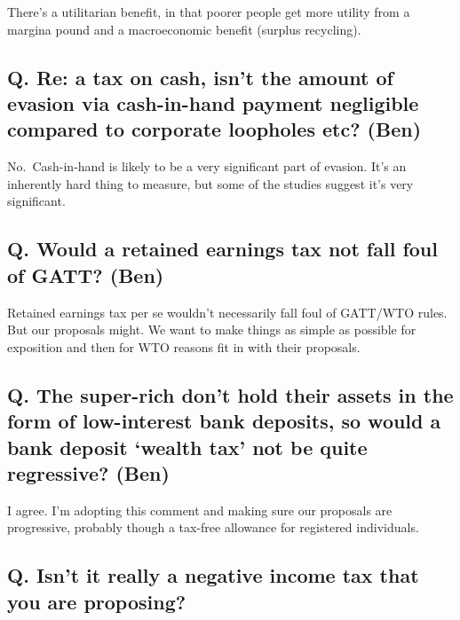 \documentclass[]{tufte-handout}
\begin{document}
There's a utilitarian benefit, in that poorer people get more utility
from a margina pound and a macroeconomic benefit (surplus recycling).

\hypertarget{q.-re-a-tax-on-cash-isnt-the-amount-of-evasion-via-cash-in-hand-payment-negligible-compared-to-corporate-loopholes-etc-ben}{%
\subsection{Q. Re: a tax on cash, isn't the amount of evasion via
cash-in-hand payment negligible compared to corporate loopholes etc?
(Ben)}\label{q.-re-a-tax-on-cash-isnt-the-amount-of-evasion-via-cash-in-hand-payment-negligible-compared-to-corporate-loopholes-etc-ben}}

No.~Cash-in-hand is likely to be a very significant part of evasion.
It's an inherently hard thing to measure, but some of the studies
suggest it's very significant.

\hypertarget{q.-would-a-retained-earnings-tax-not-fall-foul-of-gatt-ben}{%
\subsection{Q. Would a retained earnings tax not fall foul of GATT?
(Ben)}\label{q.-would-a-retained-earnings-tax-not-fall-foul-of-gatt-ben}}

Retained earnings tax per se wouldn't necessarily fall foul of GATT/WTO
rules. But our proposals might. We want to make things as simple as
possible for exposition and then for WTO reasons fit in with their
proposals.

\hypertarget{q.-the-super-rich-dont-hold-their-assets-in-the-form-of-low-interest-bank-deposits-so-would-a-bank-deposit-wealth-tax-not-be-quite-regressive-ben}{%
\subsection{Q. The super-rich don't hold their assets in the form of
low-interest bank deposits, so would a bank deposit `wealth tax' not be
quite regressive?
(Ben)}\label{q.-the-super-rich-dont-hold-their-assets-in-the-form-of-low-interest-bank-deposits-so-would-a-bank-deposit-wealth-tax-not-be-quite-regressive-ben}}

I agree. I'm adopting this comment and making sure our proposals are
progressive, probably though a tax-free allowance for registered
individuals.

\hypertarget{q.-isnt-it-really-a-negative-income-tax-that-you-are-proposing}{%
\subsection{Q. Isn't it really a negative income tax that you are
proposing?}\label{q.-isnt-it-really-a-negative-income-tax-that-you-are-proposing}}
\end{document}
